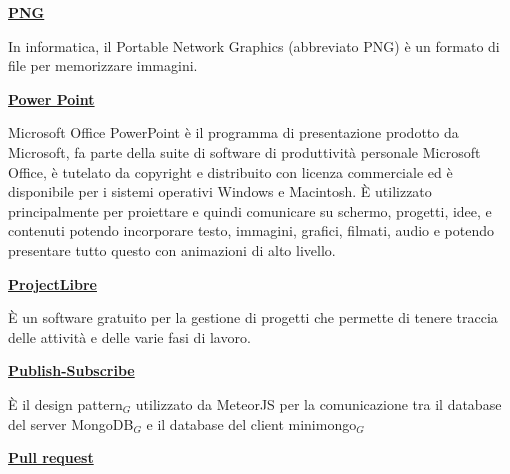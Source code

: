 \bigskip
\begin{addmargin}[0em]{0em}	
	\textbf{\underline{PNG}} 
\end{addmargin}
\medskip
\begin{addmargin}[5em]{1em}
In informatica, il Portable Network Graphics (abbreviato PNG) è un formato di file per memorizzare immagini.
\end{addmargin}	

\bigskip
\begin{addmargin}[0em]{0em}	
	\textbf{\underline{Power Point}}
\end{addmargin} 

\medskip
\begin{addmargin}[5em]{1em}
Microsoft Office PowerPoint è il programma di presentazione prodotto da Microsoft, fa parte della suite di software di produttività personale Microsoft Office, è tutelato da copyright e distribuito con licenza commerciale ed è disponibile per i sistemi operativi Windows e Macintosh. È utilizzato principalmente per proiettare e quindi comunicare su schermo, progetti, idee, e contenuti potendo incorporare testo, immagini, grafici, filmati, audio e potendo presentare tutto questo con animazioni di alto livello.
\end{addmargin}	

\bigskip
\begin{addmargin}[0em]{0em}	
	\textbf{\underline{ProjectLibre}} 
\end{addmargin}
	
\medskip
\begin{addmargin}[5em]{1em}	
È un software gratuito per la gestione di progetti che permette di tenere traccia delle attività e delle varie fasi di lavoro.
\end{addmargin}

\bigskip
\begin{addmargin}[0em]{0em}
	\textbf{\underline{Publish-Subscribe}} 
\end{addmargin}
	
\medskip
\begin{addmargin}[5em]{1em}
È il design pattern$_G$ utilizzato da MeteorJS per la comunicazione tra il database del server MongoDB$_G$ e il database del client minimongo$_G$
\end{addmargin}	

\bigskip
\begin{addmargin}[0em]{0em}
	\textbf{\underline{Pull request}} 
\end{addmargin}
	
